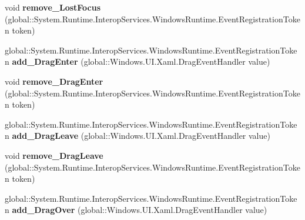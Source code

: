 \begin{DoxyCompactItemize}
\item 
\mbox{\label{interface_windows_1_1_u_i_1_1_xaml_1_1_i_u_i_element_a735a5482f18ebef41ee23b3508022834}} 
void {\bfseries remove\+\_\+\+Lost\+Focus} (global\+::\+System.\+Runtime.\+Interop\+Services.\+Windows\+Runtime.\+Event\+Registration\+Token token)
\item 
\mbox{\label{interface_windows_1_1_u_i_1_1_xaml_1_1_i_u_i_element_a2fed84aaafd99d2ab6c95997a486fc7a}} 
global\+::\+System.\+Runtime.\+Interop\+Services.\+Windows\+Runtime.\+Event\+Registration\+Token {\bfseries add\+\_\+\+Drag\+Enter} (global\+::\+Windows.\+U\+I.\+Xaml.\+Drag\+Event\+Handler value)
\item 
\mbox{\label{interface_windows_1_1_u_i_1_1_xaml_1_1_i_u_i_element_a5a5960af1b1feea08a32346a9df72973}} 
void {\bfseries remove\+\_\+\+Drag\+Enter} (global\+::\+System.\+Runtime.\+Interop\+Services.\+Windows\+Runtime.\+Event\+Registration\+Token token)
\item 
\mbox{\label{interface_windows_1_1_u_i_1_1_xaml_1_1_i_u_i_element_ad7eb2baf580fcb2515afa4af987599d4}} 
global\+::\+System.\+Runtime.\+Interop\+Services.\+Windows\+Runtime.\+Event\+Registration\+Token {\bfseries add\+\_\+\+Drag\+Leave} (global\+::\+Windows.\+U\+I.\+Xaml.\+Drag\+Event\+Handler value)
\item 
\mbox{\label{interface_windows_1_1_u_i_1_1_xaml_1_1_i_u_i_element_ad457a93ec08cee7b4f4b038673af7df0}} 
void {\bfseries remove\+\_\+\+Drag\+Leave} (global\+::\+System.\+Runtime.\+Interop\+Services.\+Windows\+Runtime.\+Event\+Registration\+Token token)
\item 
\mbox{\label{interface_windows_1_1_u_i_1_1_xaml_1_1_i_u_i_element_a6deb1e61adbba0617ff0428e75ee83da}} 
global\+::\+System.\+Runtime.\+Interop\+Services.\+Windows\+Runtime.\+Event\+Registration\+Token {\bfseries add\+\_\+\+Drag\+Over} (global\+::\+Windows.\+U\+I.\+Xaml.\+Drag\+Event\+Handler value)
\item 
\mbox{\label{interface_windows_1_1_u_i_1_1_xaml_1_1_i_u_i_element_a3fe57bf41ebbf92eca2afbd6cf17c63f}} 

\end{DoxyCompactItemize}
